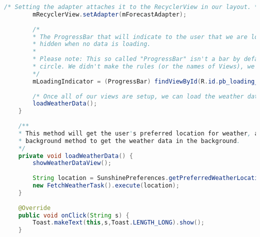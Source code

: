 \documentclass[12pt]{article} %
\begin{document}
\begin{lstlisting}[language=Java]
		/* Setting the adapter attaches it to the RecyclerView in our layout. */
		mRecyclerView.setAdapter(mForecastAdapter);
		
		/*
		* The ProgressBar that will indicate to the user that we are loading data. It will be
		* hidden when no data is loading.
		*
		* Please note: This so called "ProgressBar" isn't a bar by default. It is more of a
		* circle. We didn't make the rules (or the names of Views), we just follow them.
		*/
		mLoadingIndicator = (ProgressBar) findViewById(R.id.pb_loading_indicator);
		
		/* Once all of our views are setup, we can load the weather data. */
		loadWeatherData();
	}
	
	/**
	* This method will get the user's preferred location for weather, and then tell some
	* background method to get the weather data in the background.
	*/
	private void loadWeatherData() {
		showWeatherDataView();
		
		String location = SunshinePreferences.getPreferredWeatherLocation(this);
		new FetchWeatherTask().execute(location);
	}
	
	@Override
	public void onClick(String s) {
		Toast.makeText(this,s,Toast.LENGTH_LONG).show();
	}
	
\end{lstlisting}
\end{document}
